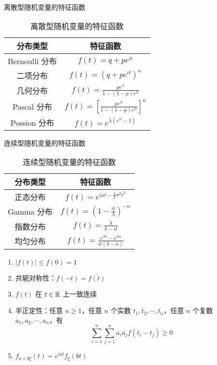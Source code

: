 \documentclass[12pt,a4paper]{amsart}
\begin{document}
\begin{proposition}[各种分布的特征函数]
    离散型随机变量的特征函数
    \begin{table}[H]
        \centering
        \caption{离散型随机变量的特征函数}
        \begin{tabular}{cc}
            \toprule
            分布类型 & 特征函数                            \\
            \midrule
            Bernoulli 分布     & $f(t) = q+pe^{it}$                             \\
            二项分布           & $f(t) = (q+pe^{it})^n$                         \\
            几何分布           & $f(t) = \frac{pe^{it}}{1-(1-p)e^{it}}$              \\
            Pascal 分布       & $f(t) = \left[\frac{pe^{it}}{1-(1-p)e^{it}}\right]^n$ \\
            Possion 分布       & $f(t) = e^{\lambda(e^{it}-1)}$                \\
            \bottomrule
        \end{tabular}
        \label{chart:1}
    \end{table}
    连续型随机变量的特征函数
    \begin{table}[H]
        \centering
        \caption{连续型随机变量的特征函数}
        \begin{tabular}{cc}
            \toprule
            分布类型 & 特征函数                            \\
            \midrule
            正态分布           & $f(t) = e^{i\mu t-\frac{1}{2}\sigma^2t^2}$ \\
            Gamma 分布         & $f(t) = (1-\frac{it}{\lambda})^{-\alpha}$ \\
            指数分布           & $f(t) = \frac{\lambda}{\lambda - it}$ \\
            均匀分布           & $f(t) = \frac{e^{itb}-e^{ita}}{it(b-a)}$ \\
            \bottomrule
        \end{tabular}
        \label{chart:2}
    \end{table}
\end{proposition}

\begin{proposition}[特征函数基本性质]
    \begin{enumerate}
        \item $|f(t)|\leq f(0) = 1$
        \item 共轭对称性：$f(-t) = \overline{f(t)}$
        \item $f(t)$ 在 $t\in \mathbb{R}$ 上一致连续
        \item 半正定性：任意 $n\geq 1$，任意 $n$ 个实数 $t_1, t_2, \cdots, t_n$，任意 $n$ 个复数 $a_1, a_2, \cdots, a_n$，有
        \begin{equation}
            \sum_{i=1}^{n} \sum_{j=1}^{n} a_i \overline{a_j} f(t_i - t_j) \geq 0
        \end{equation}
        \item $f_{a+b\xi}(t) = e^{iat}f_{\xi}(bt)$
    \end{enumerate}
\end{proposition}
\end{document}
